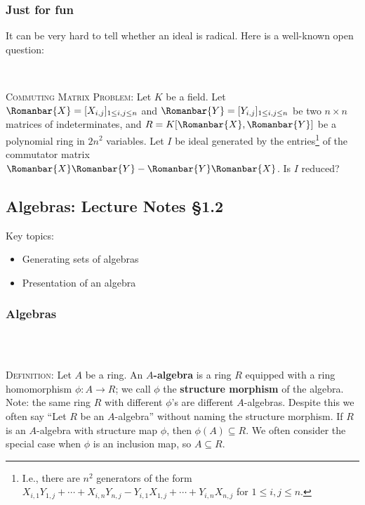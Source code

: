 \documentclass[12pt]{amsart}
\newcommand{\0}{$\phantom{.}$}
\newcommand{\1}{\mathbbm{1}}
\newcommand{\sssec}[1]{\subsubsection*{#1}}
\begin{document}
\subsubsection*{Just for fun} It can be very hard to tell whether an ideal is radical. Here is a well-known open question: 

\

\noindent \textsc{Commuting Matrix Problem:} Let $K$ be a field. Let $\Romanbar{X}=[X_{i,j}]_{1\leq i,j \leq n}$ and $\Romanbar{Y}=[Y_{i,j}]_{1\leq i,j \leq n}$ be two $n\times n$ matrices of indeterminates, and $R=K[\Romanbar{X},\Romanbar{Y}]$ be a polynomial ring in $2n^2$ variables. Let $I$ be ideal generated by the entries\footnote{I.e., there are $n^2$ generators of the form $X_{i,1} Y_{1,j} + \cdots +  X_{i,n} Y_{n,j} - Y_{i,1} X_{1,j} + \cdots +  Y_{i,n} X_{n,j}$ for $1\leq i,j\leq n$.} of the commutator matrix $\Romanbar{X}\Romanbar{Y}-\Romanbar{Y}\Romanbar{X}$. Is $I$ reduced?


\newpage




\subsection{Algebras: Lecture Notes \S1.2}



\begin{framed} Key topics:
\begin{itemize}
\item Generating sets of algebras
\item Presentation of an algebra
\end{itemize}
\end{framed}



\sssec{Algebras} \0

\

\noindent \textsc{Definition:} Let $A$ be a ring. An \textbf{$A$-algebra} is a ring $R$ equipped with a ring homomorphism ${\phi:A\to R}$; we call $\phi$ the \textbf{structure morphism} of the algebra. Note: the same ring $R$ with different $\phi$'s are different {$A$-algebras}. Despite this we often say ``Let $R$ be an $A$-algebra'' without naming the structure morphism. If $R$ is an $A$-algebra with structure map $\phi$, then $\phi(A) \subseteq R$. We often consider the special case when $\phi$ is an inclusion map, so $A\subseteq R$.
\end{document}
